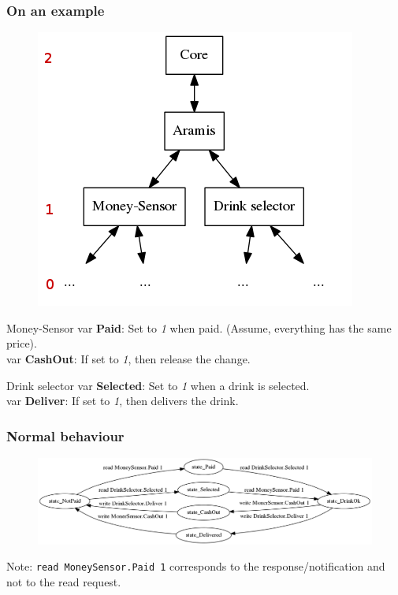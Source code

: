 \documentclass{beamer}
\begin{document}
\begin{frame}
    \frametitle{On an example}

    \begin{figure}[htb]
        \centering
        \includegraphics[scale=.3]{example}
    \end{figure}
    \vfill
    \begin{block}{Money-Sensor}
        var {\bf Paid}: Set to {\em 1} when paid. (Assume, everything has the same price).\\
        var {\bf CashOut}: If set to {\em 1}, then release the change.
    \end{block}
    \vfill
    \begin{block}{Drink selector}
        var {\bf Selected}: Set to {\em 1} when a drink is selected.\\
        var {\bf Deliver}: If set to {\em 1}, then delivers the drink.
    \end{block}
\end{frame}

\begin{frame}
    \frametitle{Normal behaviour}

    \begin{figure}[htb]
        \centering
        \includegraphics[scale=.32]{drink}
    \end{figure}
    \vfill
    Note: {\tt read MoneySensor.Paid 1} corresponds to the response/notification and not to the read request.
\end{frame}
\end{document}
